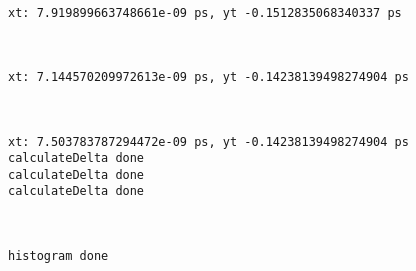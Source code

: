 \documentclass[11pt]{article}
\begin{document}
    \begin{Verbatim}[commandchars=\\\{\}]
xt: 7.919899663748661e-09 ps, yt -0.1512835068340337 ps

    \end{Verbatim}

    \begin{center}
    \end{center}
    { \hspace*{\fill} \\}
    
    \begin{Verbatim}[commandchars=\\\{\}]
xt: 7.144570209972613e-09 ps, yt -0.14238139498274904 ps

    \end{Verbatim}

    \begin{center}
    \end{center}
    { \hspace*{\fill} \\}
    
    \begin{Verbatim}[commandchars=\\\{\}]
xt: 7.503783787294472e-09 ps, yt -0.14238139498274904 ps
calculateDelta done
calculateDelta done
calculateDelta done

    \end{Verbatim}

    \begin{center}
    \end{center}
    { \hspace*{\fill} \\}
    
    \begin{Verbatim}[commandchars=\\\{\}]
histogram done

    \end{Verbatim}

    \begin{center}
    \end{center}
    { \hspace*{\fill} \\}
    
\end{document}

